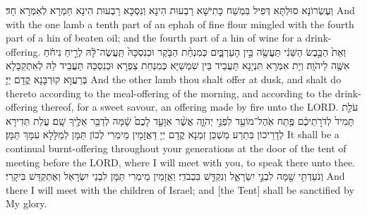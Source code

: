 {{וְעֶשְׂרוֹנָא סוּלְתָּא דְּפִיל בִּמְשַׁח כָּתִישָׁא רַבְעוּת הִינָא וְנִסְכָּא רַבְעוּת הִינָא חַמְרָא לְאִמְּרָא חַד׃}
{And with the one lamb a tenth part of an ephah of fine flour mingled with the fourth part of a hin of beaten oil; and the fourth part of a hin of wine for a drink-offering.}{}
{וְאֵת֙ הַכֶּ֣בֶשׂ הַשֵּׁנִ֔י תַּעֲשֶׂ֖ה בֵּ֣ין הָעַרְבָּ֑יִם כְּמִנְחַ֨ת הַבֹּ֤קֶר וּכְנִסְכָּהּ֙ תַּֽעֲשֶׂה־לָּ֔הּ לְרֵ֣יחַ נִיחֹ֔חַ אִשֶּׁ֖ה לַיהֹוָֽה׃
}
{וְיָת אִמְּרָא תִּנְיָנָא תַּעֲבֵיד בֵּין שִׁמְשַׁיָּא כְּמִנְחַת צַפְרָא וּכְנִסְכַּהּ תַּעֲבֵיד לַהּ לְאִתְקַבָּלָא בְּרַעֲוָא קוּרְבָּנָא קֳדָם יְיָ׃}
{And the other lamb thou shalt offer at dusk, and shalt do thereto according to the meal-offering of the morning, and according to the drink-offering thereof, for a sweet savour, an offering made by fire unto the LORD.}{}
{עֹלַ֤ת תָּמִיד֙ לְדֹרֹ֣תֵיכֶ֔ם פֶּ֥תַח אֹֽהֶל־מוֹעֵ֖ד לִפְנֵ֣י יְהֹוָ֑ה אֲשֶׁ֨ר אִוָּעֵ֤ד לָכֶם֙ שָׁ֔מָּה לְדַבֵּ֥ר אֵלֶ֖יךָ שָֽׁם׃
}
{עֲלַת תְּדִירָא לְדָרֵיכוֹן בִּתְרַע מַשְׁכַּן זִמְנָא קֳדָם יְיָ דַּאֲזָמֵין מֵימְרִי לְכוֹן תַּמָּן לְמַלָּלָא עִמָּךְ תַּמָּן׃}
{It shall be a continual burnt-offering throughout your generations at the door of the tent of meeting before the LORD, where I will meet with you, to speak there unto thee.}{}
{וְנֹעַדְתִּ֥י שָׁ֖מָּה לִבְנֵ֣י יִשְׂרָאֵ֑ל וְנִקְדַּ֖שׁ בִּכְבֹדִֽי׃
}
{וַאֲזָמֵין מֵימְרִי תַּמָּן לִבְנֵי יִשְׂרָאֵל וְאֶתְקַדַּשׁ בִּיקָרִי׃}
{And there I will meet with the children of Israel; and [the Tent] shall be sanctified by My glory.}{}
}
